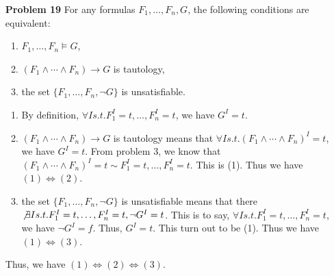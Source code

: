\begin{enumerate}
\item[\textbf{Problem 19}] For any formulas $F_1, \ldots, F_n, G$, the following conditions are equivalent:
\begin{enumerate}[(1)]
\item $F_1, \ldots, F_n \models G$, 
\item $(F_1 \wedge \cdots \wedge F_n) \rightarrow G$ is tautology, 
\item the set $\{F_1, \ldots, F_n, \neg G \}$ is unsatisfiable. 
\end{enumerate}
\begin{enumerate}[(1)]
\item By definition, $\forall I s.t. F_1^I = t, \ldots, F_n^I = t$, we have $G^I = t$. 
\item $(F_1 \wedge \cdots \wedge F_n) \rightarrow G$ is tautology means that $\forall I s.t. (F_1 \wedge \cdots \wedge F_n)^I = t$, we have $G^I = t$. From problem 3, we know that $(F_1 \wedge \cdots \wedge F_n)^I = t \sim F_1^I = t, \ldots, F_n^I = t$. This is (1). Thus we have $(1) \Longleftrightarrow (2)$. 
\item the set $\{F_1, \ldots, F_n, \neg G \}$ is unsatisfiable means that there $\not \exists I s.t. F_1^I = t, \ldots, F_n^I = t, \neg G^I = t$. This is to say, $\forall I s.t. F_1^I = t, \ldots, F_n^I = t$, we have $\neg G^I = f$. Thus, $G^I = t$. This turn out to be (1). Thus we have $(1) \Longleftrightarrow (3)$. 
\end{enumerate}
Thus, we have $ (1) \Longleftrightarrow (2) \Longleftrightarrow (3)$. 
\end{enumerate}

